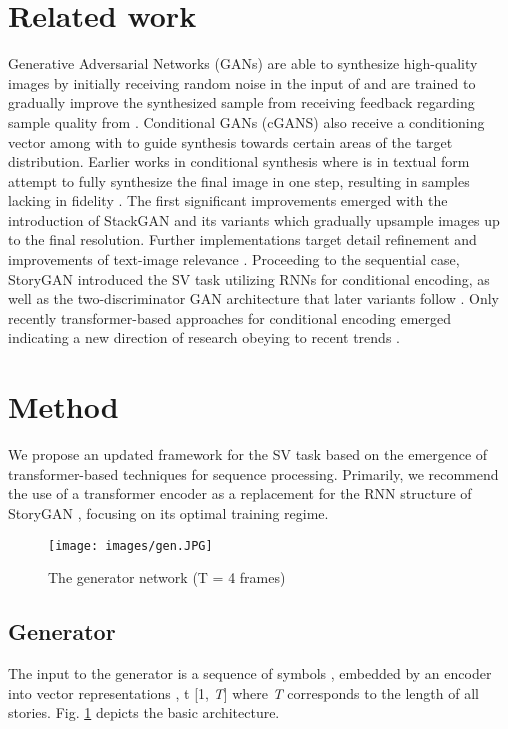 \documentclass{article}
\begin{document}
\section{Related work}
\label{sec:literature}
Generative Adversarial Networks (GANs) \cite{goodfellow2014gans} are able to synthesize high-quality images by initially receiving random noise  in the input of  and are trained to gradually improve the synthesized sample from receiving feedback regarding sample quality from . Conditional GANs (cGANS) also receive a conditioning vector  among with  to guide synthesis towards certain areas of the target distribution. Earlier works in conditional synthesis where  is in textual form attempt to fully synthesize the final image in one step, resulting in samples lacking in fidelity \cite{reed2016t2i}. The first significant improvements emerged with the introduction of StackGAN \cite{stackgan} and its variants \cite{zhang2018stackgan} which gradually upsample images up to the final resolution. Further implementations target detail refinement \cite{xu2018attngan, zhu2019dmgan} and improvements of text-image relevance \cite{segan}. Proceeding to the sequential case, StoryGAN \cite{storygan} introduced the SV task utilizing RNNs for conditional encoding, as well as the two-discriminator GAN architecture that later variants follow \cite{pororogan, li2020storygan}. Only recently transformer-based approaches for conditional encoding emerged \cite{Maharana2021ImprovingGA, Maharana2021IntegratingVL} indicating a new direction of research obeying to recent trends \cite{transformer}.

 
\section{Method}
\label{sec:method}
\label{sec:architecture}
We propose an updated framework for the SV task based on the emergence of transformer-based techniques for sequence processing. Primarily, we recommend the use of a transformer encoder \cite{transformer} as a replacement for the RNN structure of StoryGAN \cite{storygan}, focusing on its optimal training regime. 


\begin{figure}[b]
\centering
\texttt{[image: images/gen.JPG]}
\caption{The generator  network (T = 4 frames)}
\label{fig:gen}
\end{figure}

\subsection{Generator}
The input to the generator  is a sequence of symbols , embedded by an encoder into vector representations , t  [1, \textit{T}] where  \textit{T} corresponds to the length of all stories. Fig. \ref{fig:gen} depicts the basic  architecture.
\end{document}
